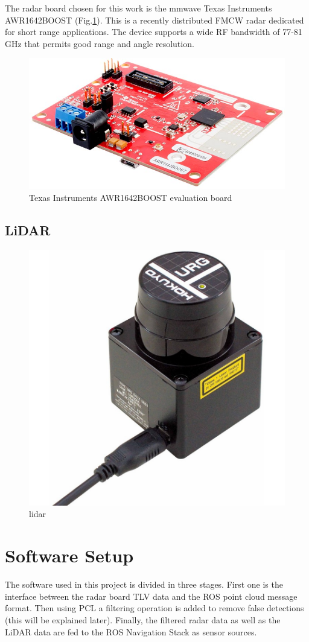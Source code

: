 The radar board chosen for this work is the mmwave Texas Instruments AWR1642BOOST (Fig.\ref{fig:awr}). This is a recently distributed \ac{FMCW} radar dedicated for short range applications. The device supports a wide RF bandwidth of 77-81 GHz that permits good range and angle resolution.

\begin{figure}[h] 
\centerline{\includegraphics [width=0.5 \textwidth]{imgs/chapter4/awr1642.jpg}}
\caption{Texas Instruments AWR1642BOOST evaluation board}
\label{fig:awr}
\end{figure}

\subsection{LiDAR}
\begin{figure}[h] 
\centerline{\includegraphics [width=0.5 \textwidth]{imgs/chapter4/lidar.jpg}}
\caption{lidar}
\label{fig:lidar}
\end{figure}

\section{Software Setup}

The software used in this project is divided in three stages. First one is the interface between the radar board TLV data and the ROS point cloud message format. Then using \ac{PCL} a filtering operation is added to remove false detections (this will be explained later). Finally, the filtered radar data as well as the \ac{LiDAR} data are fed to the ROS Navigation Stack as sensor sources. 

